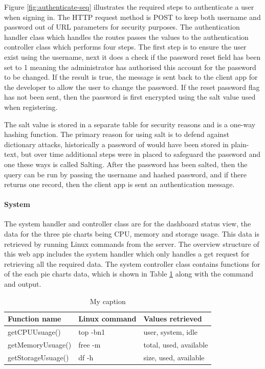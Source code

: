 Figure \ref{fig:authenticate-seq} illustrates the required steps to authenticate a user when signing in. The HTTP request method is POST to keep both username and password out of URL parameters for security purposes. The authentication handler class which handles the routes passes the values to the authentication controller class which performs four steps. The first step is to ensure the user exist using the username, next it does a check if the password reset field has been set to 1 meaning the administrator has authorised this account for the password to be changed. If the result is true, the message is sent back to the client app for the developer to allow the user to change the password. If the reset password flag has not been sent, then the password is first encrypted using the salt value used when registering.

The salt value is stored in a separate table for security reasons and is a one-way hashing function. The primary reason for using salt is to defend against dictionary attacks, historically a password of would have been stored in plain-text, but over time additional steps were in placed to safeguard the password and one these ways is called Salting. After the password has been salted, then the query can be run by passing the username and hashed password, and if there returns one record, then the client app is sent an authentication message.

\paragraph{System}

The system handler and controller class are for the dashboard status view, the data for the three pie charts being CPU, memory and storage usage. This data is retrieved by running Linux commands from the server. The overview structure of this web app includes the system handler which only handles a get request for retrieving all the required data. The system controller class contains functions for of the each pie charts data, which is shown in Table \ref{tb:system} along with the command and output. 

\begin{table}[!h]
\centering
\caption{My caption}
\label{tb:system}
\begin{tabular}{|l|l|l|}
\hline
\rowcolor{green!20}
Function name    & Linux command & Values retrieved       \\ \hline
getCPUUsuage()     & top -bn1      & user, system, idle     \\ \hline
getMemoryUsuage()  & free -m       & total, used, available \\ \hline
getStorageUsuage() & df -h         & size, used, available  \\ \hline
\end{tabular}
\end{table}

